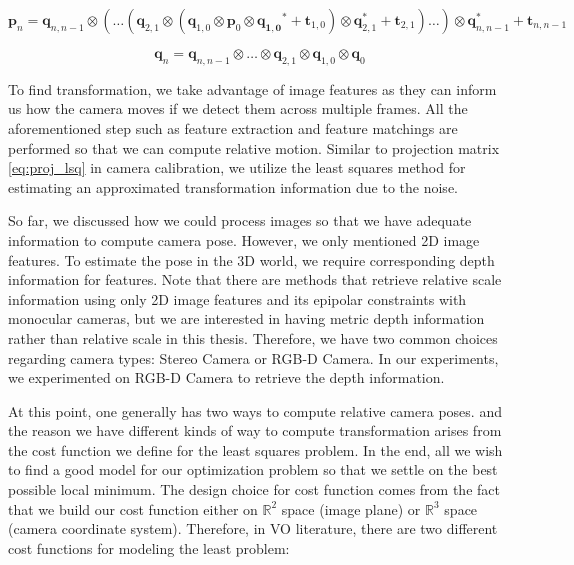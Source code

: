 \documentclass[a4paper]{report}
\numberwithin{figure}{section}
\newcommand{\R}{\mathbb{R}}
\begin{document}
\begin{equation}
  \mathbf{p}_{n} = 
  \mathbf{q}_{n, n-1} \otimes (\dots
  (\mathbf{q}_{2,1} \otimes
  (\mathbf{q}_{1,0} \otimes \mathbf{p}_0 \otimes \mathbf{q_{1,0}}^* + \mathbf{t}_{1,0})
  \otimes \mathbf{q}_{2,1}^* + \mathbf{t}_{2,1})
  \dots) \otimes \mathbf{q}_{n, n-1}^* +\mathbf{t}_{n, n-1} 
\end{equation}

\begin{equation}
  \mathbf{q}_{n} = 
  \mathbf{q}_{n,n-1} \otimes \dots \otimes \mathbf{q}_{2,1} \otimes \mathbf{q}_{1,0} \otimes \mathbf{q}_{0} 
\end{equation}

To find transformation, we take advantage of image features as they can inform 
us how the camera moves if we detect them across multiple frames.  All the 
aforementioned step such as feature extraction and feature matchings are 
performed so that we can compute relative motion.  Similar to projection 
matrix \eqref{eq:proj_lsq} in camera calibration, we utilize the least squares 
method for estimating an approximated transformation information due to the 
noise. 


So far, we discussed how we could process images so that we have adequate 
information to compute camera pose. However, we only mentioned 2D image 
features. To estimate the pose in the 3D world, we require corresponding depth 
information for features. Note that there are methods that retrieve relative 
scale information using only 2D image features and its epipolar constraints 
with monocular cameras, but we are interested in having metric depth 
information rather than relative scale in this thesis. Therefore, we have two 
common choices regarding camera types: Stereo Camera or RGB-D Camera. In our 
experiments, we experimented on RGB-D Camera to retrieve the depth information.

At this point, one generally has two ways to compute relative camera poses.  
and the reason we have different kinds of way to compute transformation arises 
from the cost function we define for the least squares problem. In the end, 
all we wish to find a good model for our optimization problem so that we 
settle on the best possible local minimum.  The design choice for cost 
function comes from the fact that we build our cost function either on $\R^2$ 
space (image plane) or $\R^3$ space (camera coordinate system).  Therefore, in 
VO literature, there are two different cost functions for modeling the least 
problem:
\end{document}
